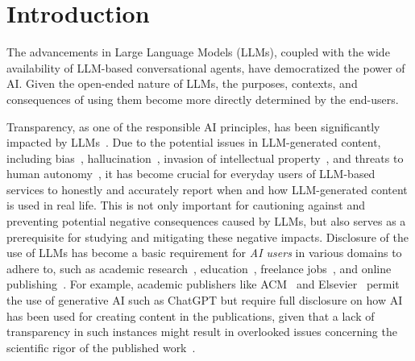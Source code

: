 \section{Introduction}

The advancements in Large Language Models (LLMs), coupled with the wide availability of LLM-based conversational agents, have democratized the power of AI.
Given the open-ended nature of LLMs, the purposes, contexts, and consequences of using them become more directly determined by the end-users.

Transparency, as one of the responsible AI principles, has been significantly impacted by LLMs~\cite{liao2023ai}.
Due to the potential issues in LLM-generated content, including bias~\cite{abid2021persistent, isaza2023fairy}, hallucination~\cite{bender2021dangers, dahl2024large, yao-etal-2024-samples}, invasion of intellectual property~\cite{karamolegkou2023copyright}, and threats to human autonomy~\cite{parasuraman2010complacency}, it has become crucial for everyday users of LLM-based services to honestly and accurately report when and how LLM-generated content is used in real life.
This is not only important for cautioning against and preventing potential negative consequences caused by LLMs, but also serves as a prerequisite for studying and mitigating these negative impacts.
Disclosure of the use of LLMs has become a basic requirement for \textit{AI users} in various domains to adhere to, such as academic research~\cite{ACM2023AuthorshipPolicy, Elsevier2024AIWritingPolicy}, education~\cite{Harvard2024ChatGPTGuidelines, UMNLib2024LibGuide, UBCLibrary2024CitingGenAI, MSU2024GenAIGuidance}, freelance jobs~\cite{Upwork2024ChatGPTStance}, and online publishing~\cite{Medium2024DistStandards}.
For example, academic publishers like ACM~\cite{ACM2023AuthorshipPolicy} and Elsevier~\cite{Elsevier2024AIWritingPolicy} permit the use of generative AI such as ChatGPT but require full disclosure on how AI has been used for creating content in the publications, given that a lack of transparency in such instances might result in overlooked issues concerning the scientific rigor of the published work~\cite{kaebnick2023editors}.


